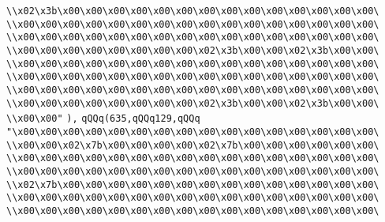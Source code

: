 \verb|\\x02\x3b\x00\x00\x00\x00\x00\x00\x00\x00\x00\x00\x00\x00\x00\x00\|\newline
\verb|\\x00\x00\x00\x00\x00\x00\x00\x00\x00\x00\x00\x00\x00\x00\x00\x00\|\newline
\verb|\\x00\x00\x00\x00\x00\x00\x00\x00\x00\x00\x00\x00\x00\x00\x00\x00\|\newline
\verb|\\x00\x00\x00\x00\x00\x00\x00\x00\x02\x3b\x00\x00\x02\x3b\x00\x00\|\newline
\verb|\\x00\x00\x00\x00\x00\x00\x00\x00\x00\x00\x00\x00\x00\x00\x00\x00\|\newline
\verb|\\x00\x00\x00\x00\x00\x00\x00\x00\x00\x00\x00\x00\x00\x00\x00\x00\|\newline
\verb|\\x00\x00\x00\x00\x00\x00\x00\x00\x00\x00\x00\x00\x00\x00\x00\x00\|\newline
\verb|\\x00\x00\x00\x00\x00\x00\x00\x00\x02\x3b\x00\x00\x02\x3b\x00\x00\|\newline
\verb|\\x00\x00"|\newline
\verb|),|\newline
\verb|qQQq(635,qQQq129,qQQq|\newline
\verb|"\x00\x00\x00\x00\x00\x00\x00\x00\x00\x00\x00\x00\x00\x00\x00\x00\|\newline
\verb|\\x00\x00\x02\x7b\x00\x00\x00\x00\x02\x7b\x00\x00\x00\x00\x00\x00\|\newline
\verb|\\x00\x00\x00\x00\x00\x00\x00\x00\x00\x00\x00\x00\x00\x00\x00\x00\|\newline
\verb|\\x00\x00\x00\x00\x00\x00\x00\x00\x00\x00\x00\x00\x00\x00\x00\x00\|\newline
\verb|\\x02\x7b\x00\x00\x00\x00\x00\x00\x00\x00\x00\x00\x00\x00\x00\x00\|\newline
\verb|\\x00\x00\x00\x00\x00\x00\x00\x00\x00\x00\x00\x00\x00\x00\x00\x00\|\newline
\verb|\\x00\x00\x00\x00\x00\x00\x00\x00\x00\x00\x00\x00\x00\x00\x00\x00\|\newline

